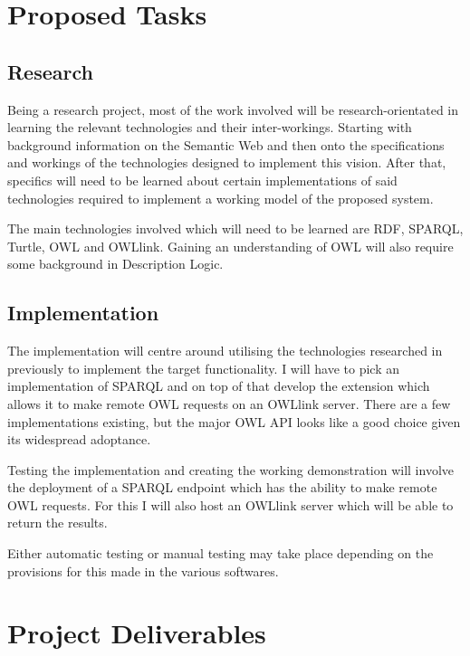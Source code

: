 \documentclass{article}
\begin{document}
\section{Proposed Tasks}

\subsection{Research}

Being a research project, most of the work involved will be research-orientated
in learning the relevant technologies and their inter-workings. Starting with
background information on the Semantic Web\cite{semweb} and then onto the specifications and
workings of the technologies designed to implement this vision. After that,
specifics will need to be learned about certain implementations of said
technologies required to implement a working model of the proposed system.

The main technologies involved which will need to be learned are
RDF\cite{rdfprimer}, SPARQL, Turtle, OWL and OWLlink. Gaining an understanding
of OWL will also require some background in Description Logic\cite{desclogic}.

\subsection{Implementation}

The implementation will centre around utilising the technologies researched in
previously to implement the target functionality. I will have to pick an
implementation of SPARQL and on top of that develop the extension which allows it to
make remote OWL requests on an OWLlink server. There are a few implementations
existing, but the major OWL API looks like a good choice given its widespread
adoptance.

Testing the implementation and creating the working demonstration will involve
the deployment of a SPARQL endpoint which has the ability to make remote OWL
requests. For this I will also host an OWLlink server which will be able to
return the results.

Either automatic testing or manual testing may take place depending on the
provisions for this made in the various softwares.

\section{Project Deliverables}
\end{document}
